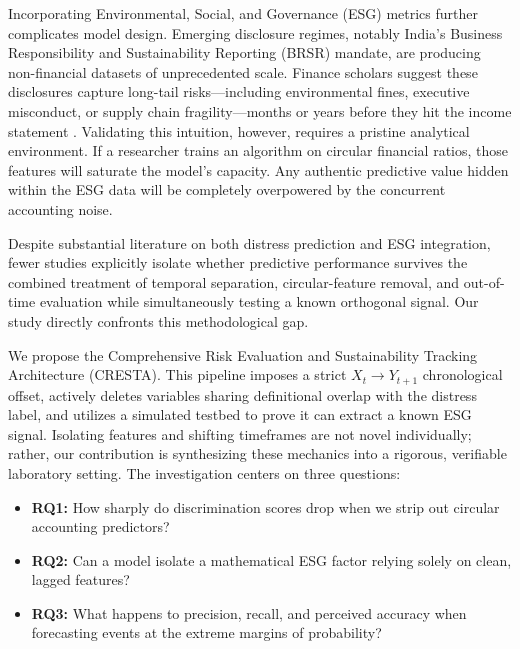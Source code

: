 \documentclass[sigconf,anonymous]{acmart}
\begin{document}
Incorporating Environmental, Social, and Governance (ESG) metrics further complicates model design. Emerging disclosure regimes, notably India's Business Responsibility and Sustainability Reporting (BRSR) mandate, are producing non-financial datasets of unprecedented scale. Finance scholars suggest these disclosures capture long-tail risks---including environmental fines, executive misconduct, or supply chain fragility---months or years before they hit the income statement \cite{friede2015}. Validating this intuition, however, requires a pristine analytical environment. If a researcher trains an algorithm on circular financial ratios, those features will saturate the model's capacity. Any authentic predictive value hidden within the ESG data will be completely overpowered by the concurrent accounting noise.

Despite substantial literature on both distress prediction and ESG integration, fewer studies explicitly isolate whether predictive performance survives the combined treatment of temporal separation, circular-feature removal, and out-of-time evaluation while simultaneously testing a known orthogonal signal. Our study directly confronts this methodological gap.

We propose the Comprehensive Risk Evaluation and Sustainability Tracking Architecture (CRESTA). This pipeline imposes a strict $X_t \to Y_{t+1}$ chronological offset, actively deletes variables sharing definitional overlap with the distress label, and utilizes a simulated testbed to prove it can extract a known ESG signal. Isolating features and shifting timeframes are not novel individually; rather, our contribution is synthesizing these mechanics into a rigorous, verifiable laboratory setting. The investigation centers on three questions:

\begin{itemize}
    \item \textbf{RQ1:} How sharply do discrimination scores drop when we strip out circular accounting predictors?
    \item \textbf{RQ2:} Can a model isolate a mathematical ESG factor relying solely on clean, lagged features?
    \item \textbf{RQ3:} What happens to precision, recall, and perceived accuracy when forecasting events at the extreme margins of probability?
\end{itemize}
\end{document}
